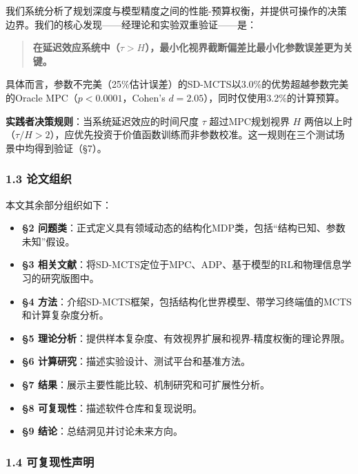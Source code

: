 \documentclass[UTF8]{ctexart}
\providecommand{\tightlist}{%
  \setlength{\itemsep}{0pt}\setlength{\parskip}{0pt}}
\begin{document}
我们系统分析了规划深度与模型精度之间的性能-预算权衡，并提供可操作的决策边界。我们的核心发现------经理论和实验双重验证------是：

\begin{quote}
\textbf{在延迟效应系统中（\(\tau > H\)），最小化视界截断偏差比最小化参数误差更为关键。}
\end{quote}

具体而言，参数不完美（25\%估计误差）的SD-MCTS以3.0\%的优势超越参数完美的Oracle
MPC（\(p < 0.0001\)，Cohen's \(d = 2.05\)），同时仅使用3.2\%的计算预算。

\textbf{实践者决策规则}：当系统延迟效应的时间尺度 \(\tau\)
超过MPC规划视界 \(H\)
两倍以上时（\(\tau/H > 2\)），应优先投资于价值函数训练而非参数校准。这一规则在三个测试场景中均得到验证（§7）。

\hypertarget{ux8bbaux6587ux7ec4ux7ec7}{%
\subsubsection{1.3 论文组织}\label{ux8bbaux6587ux7ec4ux7ec7}}

本文其余部分组织如下：

\begin{itemize}
\tightlist
\item
  \textbf{§2
  问题类}：正式定义具有领域动态的结构化MDP类，包括``结构已知、参数未知''假设。
\item
  \textbf{§3
  相关文献}：将SD-MCTS定位于MPC、ADP、基于模型的RL和物理信息学习的研究版图中。
\item
  \textbf{§4
  方法}：介绍SD-MCTS框架，包括结构化世界模型、带学习终端值的MCTS和计算复杂度分析。
\item
  \textbf{§5
  理论分析}：提供样本复杂度、有效视界扩展和视界-精度权衡的理论界限。
\item
  \textbf{§6 计算研究}：描述实验设计、测试平台和基准方法。
\item
  \textbf{§7 结果}：展示主要性能比较、机制研究和可扩展性分析。
\item
  \textbf{§8 可复现性}：描述软件仓库和复现说明。
\item
  \textbf{§9 结论}：总结洞见并讨论未来方向。
\end{itemize}

\hypertarget{ux53efux590dux73b0ux6027ux58f0ux660e}{%
\subsubsection{1.4
可复现性声明}\label{ux53efux590dux73b0ux6027ux58f0ux660e}}
\end{document}
